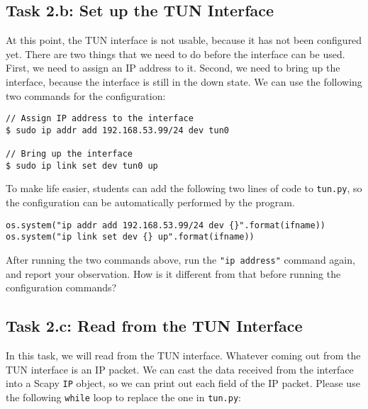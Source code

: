 \subsection{Task 2.b: Set up the TUN Interface}


At this point, the TUN interface is not usable, because it has not been configured yet. 
There are two things that we need to do before the interface can be used. First, we 
need to assign an IP address to it. Second, we need to bring up the interface, because
the interface is still in the down state. We can use the following two commands
for the configuration: 


\begin{lstlisting}
// Assign IP address to the interface 
$ sudo ip addr add 192.168.53.99/24 dev tun0

// Bring up the interface
$ sudo ip link set dev tun0 up
\end{lstlisting}
 

To make life easier, students can add the following two lines of code
to \texttt{tun.py}, so the configuration can be automatically
performed by the program. 


\begin{lstlisting}
os.system("ip addr add 192.168.53.99/24 dev {}".format(ifname)) 
os.system("ip link set dev {} up".format(ifname))              
\end{lstlisting}



After running the two commands above, run the \texttt{"ip address"} command 
again, and report your observation. How is it different from
that before running the configuration commands?



\subsection{Task 2.c: Read from the TUN Interface}


In this task, we will read from the TUN interface. Whatever coming out from the TUN interface 
is an IP packet. We can cast the data received from the interface into a Scapy \texttt{IP} 
object, so we can print out each field of the IP packet. Please use the 
following \texttt{while} loop to replace the one in \texttt{tun.py}:  

